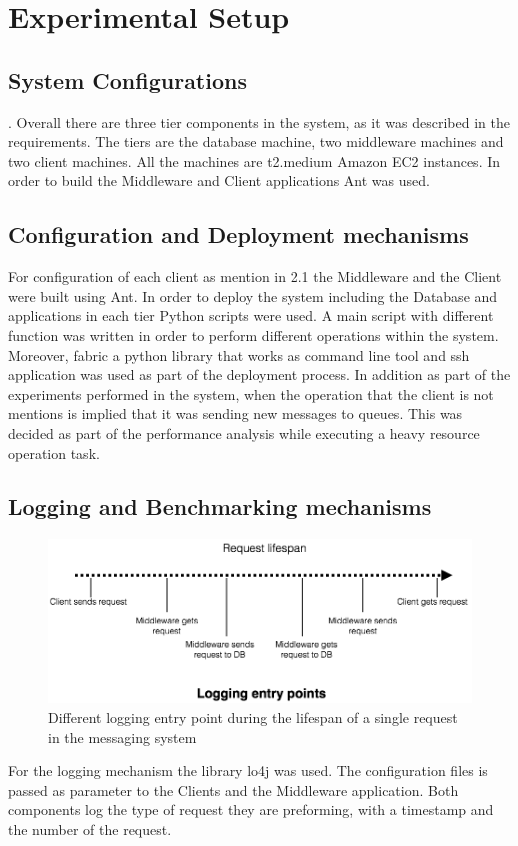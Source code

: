 \section{Experimental Setup}\label{sec:experimental-setup}

\subsection{System Configurations}\label{sec:system-configurations}
.	Overall there are three tier components in the system, as it was described in the requirements. The tiers are the database machine, two middleware machines and two client machines. All the machines are t2.medium Amazon EC2 instances. In order to build the Middleware and Client applications Ant was used.
\subsection{Configuration and Deployment mechanisms}\label{sec:configuration-and-deployment-mechanisms}
For configuration of each client as mention in 2.1 the Middleware and the Client were built using Ant. In order to deploy the system including the Database and applications in each tier Python scripts were used. A main script with different function was written in order to perform different operations within the system. Moreover, fabric a python library that works as command line tool and ssh application was used as part of the deployment process. In addition as part of the experiments performed in the system, when the operation that the client is not mentions is implied that it was sending new messages to queues. This was decided as part of the performance analysis while executing a heavy resource operation task.
\subsection{Logging and Benchmarking mechanisms}\label{sec:logging-and-benchmarking-mechanisms}
\begin{figure}[h!]
	\centering
	\includegraphics[scale=0.3]{logging.png}
	\caption{Different logging entry point during the lifespan of a single request in the messaging system}
	\label{logging}
\end{figure}
 For the logging mechanism the library lo4j was used. The configuration files is passed as parameter to the Clients and the Middleware application. Both components log the type of request they are preforming, with a timestamp and the number of the request.\\
 
